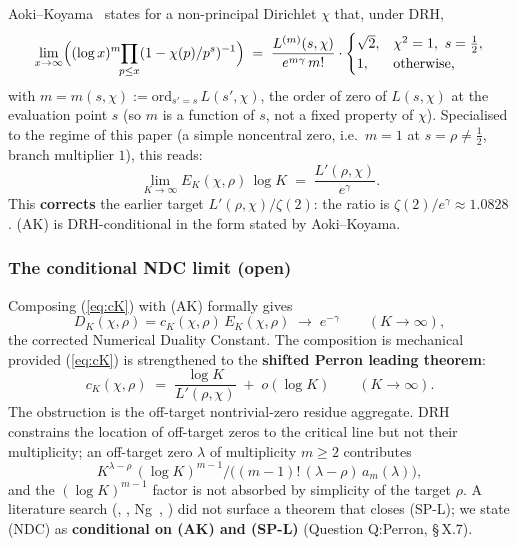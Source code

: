 Aoki--Koyama~\cite[eq.~(1.4), p.~235]{AokiKoyama2023}
states for a non-principal Dirichlet \(\chi\) that, under DRH,
\[
\lim_{x \to \infty}\Bigl((\log x)^{m}\!\!\prod_{p \le x}(1 - \chi(p)/p^s)^{-1}\Bigr)
\;=\;
\frac{L^{(m)}(s,\chi)}{e^{m\gamma}\,m!} \cdot
\begin{cases}\sqrt 2, & \chi^2 = 1,\ s = \tfrac12,\\ 1, & \text{otherwise,}\end{cases}
\]
with \(m = m(s,\chi) := \mathrm{ord}_{s' = s}\,L(s',\chi)\), the order
of zero of \(L(s,\chi)\) at the evaluation point \(s\) (so \(m\) is a
function of \(s\), not a fixed property of \(\chi\)). Specialised to the
regime of this paper (a simple noncentral zero, i.e.~\(m = 1\) at
\(s = \rho \ne \tfrac12\), branch multiplier \(1\)), this reads:
\begin{equation}
\label{eq:AK}
\lim_{K \to \infty} E_K(\chi,\rho)\,\log K \;=\; \frac{L'(\rho,\chi)}{e^{\gamma}}.
\tag*{(AK)}
\end{equation}
This \textbf{corrects} the earlier target \(L'(\rho,\chi) / \zeta(2)\): the
ratio is \(\zeta(2)/e^\gamma \approx 1.0828\). (AK) is DRH-conditional
in the form stated by Aoki--Koyama.

\subsubsection{The conditional NDC limit (open)}

Composing (\ref{eq:cK}) with (AK) formally gives
\begin{equation}
\label{eq:NDC}
D_K(\chi,\rho) = c_K(\chi,\rho)\,E_K(\chi,\rho)
\;\longrightarrow\; e^{-\gamma}
\qquad (K \to \infty),
\tag*{(NDC)}
\end{equation}
the corrected Numerical Duality Constant. The composition is
mechanical provided (\ref{eq:cK}) is strengthened to the \textbf{shifted
Perron leading theorem}:
\begin{equation}
\label{eq:Perron-leading}
c_K(\chi,\rho) \;=\; \frac{\log K}{L'(\rho,\chi)} \;+\; o(\log K)
\qquad (K \to \infty).
\tag*{(SP-L)}
\end{equation}
The obstruction is the off-target nontrivial-zero residue aggregate.
DRH constrains the location of off-target zeros to the critical line
but not their multiplicity; an off-target zero \(\lambda\) of
multiplicity \(m \ge 2\) contributes
\[
K^{\lambda - \rho}\,(\log K)^{m-1}\big/\bigl((m-1)!\,(\lambda - \rho)\,a_m(\lambda)\bigr),
\]
and the \((\log K)^{m-1}\) factor is not absorbed by simplicity of the
target \(\rho\). A literature search (\cite{Inoue2021}, \cite{Soundararajan2009},
Ng~\cite{Ng2004}, \cite{Akatsuka2017EulerProduct}) did not surface a theorem that closes
(SP-L); we state (NDC) as \textbf{conditional on (AK) and (SP-L)}
(Question Q:Perron, \S\,X.7).

